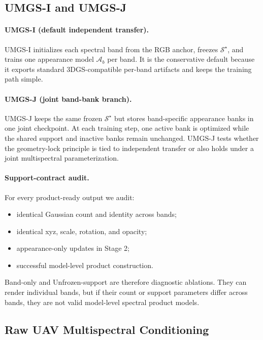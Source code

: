 \subsection{UMGS-I and UMGS-J}

\paragraph{UMGS-I (default independent transfer).}
UMGS-I initializes each spectral band from the RGB anchor, freezes $\mathcal{S}^{\star}$, and trains one appearance model $\mathcal{A}_b$ per band. It is the conservative default because it exports standard 3DGS-compatible per-band artifacts and keeps the training path simple.

\paragraph{UMGS-J (joint band-bank branch).}
UMGS-J keeps the same frozen $\mathcal{S}^{\star}$ but stores band-specific appearance banks in one joint checkpoint. At each training step, one active bank is optimized while the shared support and inactive banks remain unchanged. UMGS-J tests whether the geometry-lock principle is tied to independent transfer or also holds under a joint multispectral parameterization.

\paragraph{Support-contract audit.}
For every product-ready output we audit:
\begin{itemize}
    \item identical Gaussian count and identity across bands;
    \item identical xyz, scale, rotation, and opacity;
    \item appearance-only updates in Stage 2;
    \item successful model-level product construction.
\end{itemize}
Band-only and Unfrozen-support are therefore diagnostic ablations. They can render individual bands, but if their count or support parameters differ across bands, they are not valid model-level spectral product models.

\subsection{Raw UAV Multispectral Conditioning}

